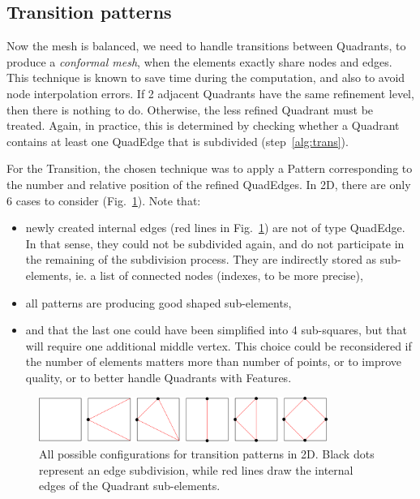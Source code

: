 \documentclass[10pt]{article}
\begin{document}
\subsection{Transition patterns}
\label{sec:transpat}
%
Now the mesh is balanced, we need to handle transitions between Quadrants, to produce a \textit{conformal mesh}, when the elements exactly share nodes and edges. This technique is known to save time during the computation, and also to avoid node interpolation errors.
If 2 adjacent Quadrants have the same refinement level, then there is nothing to do. Otherwise, the less refined Quadrant must be treated. Again, in practice, this is determined by checking whether a Quadrant contains at least one QuadEdge that is subdivided (step~\ref{alg:trans}).

For the Transition, the chosen technique was to apply a Pattern corresponding to the  number and relative position of the refined QuadEdges. In 2D, there are only 6 cases to consider (Fig.~\ref{fig:transitionpatterns}). Note that:
\begin{itemize}
\item newly created internal edges (red lines in Fig.~\ref{fig:transitionpatterns}) are not of type QuadEdge. In that sense, they could not be subdivided again, and do not participate in the remaining of the subdivision process. They are indirectly stored as sub-elements, ie. a list of connected nodes (indexes, to be more precise),
\item all patterns are producing good shaped sub-elements,
\item and that the last one could have been simplified into 4 sub-squares, but that will require one additional middle vertex. This choice could be reconsidered if the number of elements matters more than number of points, or to improve quality, or to better handle Quadrants with Features.
\end{itemize}
%
\begin{figure}[htb]
\centering
  \includegraphics[width=0.84\textwidth]{transitionPatterns.png}
 \caption{All possible configurations for transition patterns in 2D. Black dots represent an edge subdivision, while red lines draw the internal edges of the Quadrant sub-elements.}
\label{fig:transitionpatterns}
\end{figure}
\end{document}
